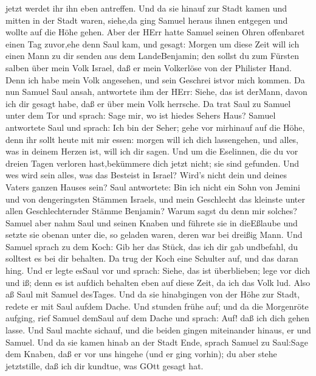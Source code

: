 jetzt werdet ihr ihn eben antreffen.  Und da sie hinauf zur
Stadt kamen und mitten in der Stadt waren, siehe,da ging Samuel heraus
ihnen entgegen und wollte auf die Höhe gehen.  Aber der
HErr hatte Samuel seinen Ohren offenbaret einen Tag zuvor,ehe denn Saul
kam, und gesagt:  Morgen um diese Zeit will ich einen Mann
zu dir senden aus dem LandeBenjamin; den sollst du zum Fürsten salben
über mein Volk Israel, daß er mein Volkerlöse von der Philister Hand.
Denn ich habe mein Volk angesehen, und sein Geschrei istvor mich kommen.
 Da nun Samuel Saul ansah, antwortete ihm der HErr: Siehe,
das ist derMann, davon ich dir gesagt habe, daß er über mein Volk
herrsche.  Da trat Saul zu Samuel unter dem Tor und sprach:
Sage mir, wo ist hiedes Sehers Haus?  Samuel antwortete
Saul und sprach: Ich bin der Seher; gehe vor mirhinauf auf die Höhe,
denn ihr sollt heute mit mir essen: morgen will ich dich lassengehen,
und alles, was in deinem Herzen ist, will ich dir sagen. 
Und um die Eselinnen, die du vor dreien Tagen verloren hast,bekümmere
dich jetzt nicht; sie sind gefunden. Und wes wird sein alles, was das
Besteist in Israel? Wird's nicht dein und deines Vaters ganzen Hauses
sein?  Saul antwortete: Bin ich nicht ein Sohn von Jemini
und von dengeringsten Stämmen Israels, und mein Geschlecht das kleinste
unter allen Geschlechternder Stämme Benjamin? Warum sagst du denn mir
solches?  Samuel aber nahm Saul und seinen Knaben und
führete sie in dieEßlaube und setzte sie obenan unter die, so geladen
waren, deren war bei dreißig Mann.  Und Samuel sprach zu
dem Koch: Gib her das Stück, das ich dir gab undbefahl, du solltest es
bei dir behalten.  Da trug der Koch eine Schulter auf, und
das daran hing. Und er legte esSaul vor und sprach: Siehe, das ist
überblieben; lege vor dich und iß; denn es ist aufdich behalten eben auf
diese Zeit, da ich das Volk lud. Also aß Saul mit Samuel desTages.
 Und da sie hinabgingen von der Höhe zur Stadt, redete er
mit Saul aufdem Dache.  Und stunden frühe auf; und da die
Morgenröte aufging, rief Samuel demSaul auf dem Dache und sprach: Auf!
daß ich dich gehen lasse. Und Saul machte sichauf, und die beiden gingen
miteinander hinaus, er und Samuel.  Und da sie kamen hinab
an der Stadt Ende, sprach Samuel zu Saul:Sage dem Knaben, daß er vor uns
hingehe (und er ging vorhin); du aber stehe jetztstille, daß ich dir
kundtue, was GOtt gesagt hat.

